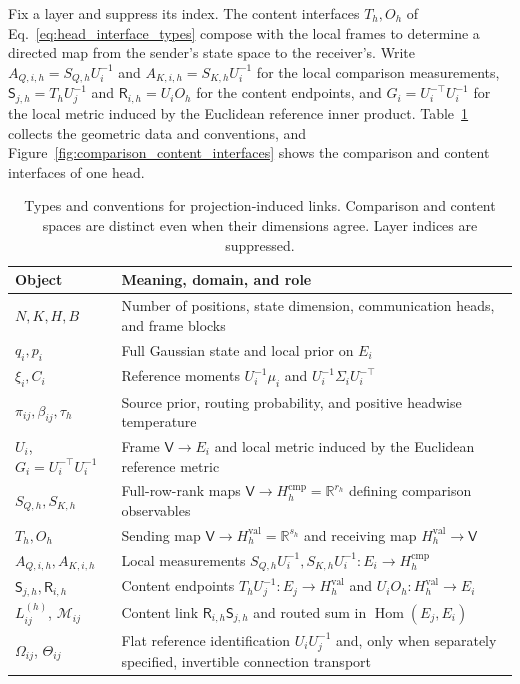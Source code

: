 \documentclass[twoside,11pt]{article}
\begin{document}
Fix a layer and suppress its index. The content interfaces \(T_h,O_h\) of Eq.~\eqref{eq:head_interface_types} compose with the local frames to determine a directed map from the sender's state space to the receiver's. Write \(A_{Q,i,h}=S_{Q,h}U_i^{-1}\) and \(A_{K,i,h}=S_{K,h}U_i^{-1}\) for the local comparison measurements, \(\mathsf S_{j,h}=T_hU_j^{-1}\) and \(\mathsf R_{i,h}=U_iO_h\) for the content endpoints, and \(G_i=U_i^{-\top}U_i^{-1}\) for the local metric induced by the Euclidean reference inner product. Table~\ref{tab:link_conventions} collects the geometric data and conventions, and Figure~\ref{fig:comparison_content_interfaces} shows the comparison and content interfaces of one head.

\begin{table}[t]
\centering
\small
\renewcommand{\arraystretch}{1.12}
\begin{tabularx}{\textwidth}{@{}lX@{}}
\toprule
Object & Meaning, domain, and role \\
\midrule
$N,K,H,B$ & Number of positions, state dimension, communication heads, and frame blocks \\
$q_i,p_i$ & Full Gaussian state and local prior on $E_i$ \\
$\xi_i,C_i$ & Reference moments $U_i^{-1}\mu_i$ and $U_i^{-1}\Sigma_iU_i^{-\top}$ \\
$\pi_{ij},\beta_{ij},\tau_h$ & Source prior, routing probability, and positive headwise temperature \\

$U_i$, $G_i=U_i^{-\top}U_i^{-1}$ & Frame $\mathsf V\to E_i$ and local metric induced by the Euclidean reference metric \\
$S_{Q,h},S_{K,h}$ & Full-row-rank maps $\mathsf V\to H_h^{\mathrm{cmp}}=\mathbb R^{r_h}$ defining comparison observables \\
$T_h,O_h$ & Sending map $\mathsf V\to H_h^{\mathrm{val}}=\mathbb R^{s_h}$ and receiving map $H_h^{\mathrm{val}}\to\mathsf V$ \\
$A_{Q,i,h},A_{K,i,h}$ & Local measurements $S_{Q,h}U_i^{-1},S_{K,h}U_i^{-1}:E_i\to H_h^{\mathrm{cmp}}$ \\
$\mathsf S_{j,h},\mathsf R_{i,h}$ & Content endpoints $T_hU_j^{-1}:E_j\to H_h^{\mathrm{val}}$ and $U_iO_h:H_h^{\mathrm{val}}\to E_i$ \\
$L_{ij}^{(h)}$, $\mathcal M_{ij}$ & Content link $\mathsf R_{i,h}\mathsf S_{j,h}$ and routed sum in $\operatorname{Hom}(E_j,E_i)$ \\
$\Omega_{ij}$, $\Theta_{ij}$ & Flat reference identification $U_iU_j^{-1}$ and, only when separately specified, invertible connection transport \\
\bottomrule
\end{tabularx}
\caption{Types and conventions for projection-induced links. Comparison and content spaces are distinct even when their dimensions agree. Layer indices are suppressed.}
\label{tab:link_conventions}
\end{table}
\end{document}
